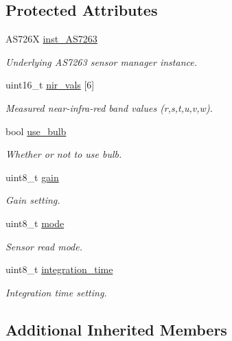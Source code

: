 \subsection*{Protected Attributes}
\begin{DoxyCompactItemize}
\item 
A\+S726X \hyperlink{class_loom___a_s7263_a653b51c97f1c478ae71ba4efc04f6f31}{inst\+\_\+\+A\+S7263}
\begin{DoxyCompactList}\small\item\em Underlying A\+S7263 sensor manager instance. \end{DoxyCompactList}\item 
uint16\+\_\+t \hyperlink{class_loom___a_s7263_a3d2e672d1bb20a793e3b0cde44fac99e}{nir\+\_\+vals} \mbox{[}6\mbox{]}
\begin{DoxyCompactList}\small\item\em Measured near-\/infra-\/red band values (r,s,t,u,v,w). \end{DoxyCompactList}\item 
bool \hyperlink{class_loom___a_s7263_a58d52744648dd8354bc875f48ef4639a}{use\+\_\+bulb}
\begin{DoxyCompactList}\small\item\em Whether or not to use bulb. \end{DoxyCompactList}\item 
uint8\+\_\+t \hyperlink{class_loom___a_s7263_ab9b7223697e11e9a0ee4aa3a207f9be5}{gain}
\begin{DoxyCompactList}\small\item\em Gain setting. \end{DoxyCompactList}\item 
uint8\+\_\+t \hyperlink{class_loom___a_s7263_a3474bf1e38b6513f517f3e364d96df36}{mode}
\begin{DoxyCompactList}\small\item\em Sensor read mode. \end{DoxyCompactList}\item 
uint8\+\_\+t \hyperlink{class_loom___a_s7263_a763628cf0f7a1d22a9c98776caa44112}{integration\+\_\+time}
\begin{DoxyCompactList}\small\item\em Integration time setting. \end{DoxyCompactList}\end{DoxyCompactItemize}
\subsection*{Additional Inherited Members}


